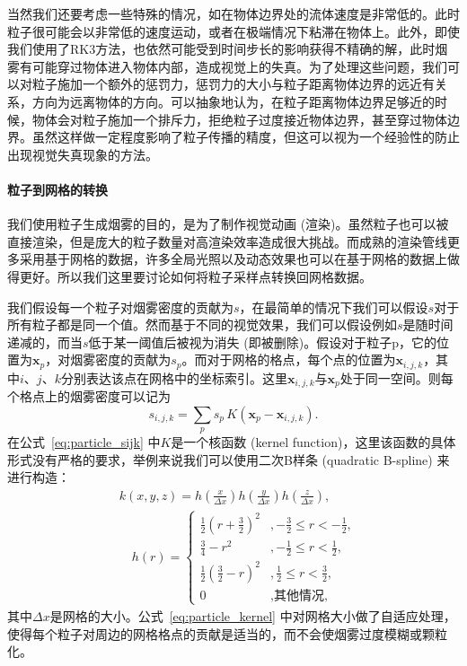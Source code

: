 当然我们还要考虑一些特殊的情况，如在物体边界处的流体速度是非常低的。此时粒子很可能会以非常低的速度运动，或者在极端情况下粘滞在物体上。此外，即使我们使用了RK3方法，也依然可能受到时间步长的影响获得不精确的解，此时烟雾有可能穿过物体进入物体内部，造成视觉上的失真。为了处理这些问题，我们可以对粒子施加一个额外的惩罚力，惩罚力的大小与粒子距离物体边界的远近有关系，方向为远离物体的方向。可以抽象地认为，在粒子距离物体边界足够近的时候，物体会对粒子施加一个排斥力，拒绝粒子过度接近物体边界，甚至穿过物体边界。虽然这样做一定程度影响了粒子传播的精度，但这可以视为一个经验性的防止出现视觉失真现象的方法。

\paragraph{粒子到网格的转换}
我们使用粒子生成烟雾的目的，是为了制作视觉动画 (渲染)。虽然粒子也可以被直接渲染，但是庞大的粒子数量对高渲染效率造成很大挑战。而成熟的渲染管线更多采用基于网格的数据，许多全局光照以及动态效果也可以在基于网格的数据上做得更好。所以我们这里要讨论如何将粒子采样点转换回网格数据。

我们假设每一个粒子对烟雾密度的贡献为$s$，在最简单的情况下我们可以假设$s$对于所有粒子都是同一个值。然而基于不同的视觉效果，我们可以假设例如$s$是随时间递减的，而当$s$低于某一阈值后被视为消失 (即被删除)。假设对于粒子p，它的位置为$\mathbf{x}_p$，对烟雾密度的贡献为$s_p$。而对于网格的格点，每个点的位置为$\mathbf{x}_{i,j,k}$，其中$i$、$j$、$k$分别表达该点在网格中的坐标索引。这里$\mathbf{x}_{i,j,k}$与$\mathbf{x}_p$处于同一空间。则每个格点上的烟雾密度可以记为
\begin{equation}
    s_{i,j,k}=\sum_p s_p \, K(\mathbf{x}_p-\mathbf{x}_{i,j,k}).
    \label{eq:particle_sijk}
\end{equation}
在公式~\ref{eq:particle_sijk} 中$K$是一个核函数 (kernel function)，这里该函数的具体形式没有严格的要求，举例来说我们可以使用二次B样条 (quadratic B-spline) 来进行构造：
\begin{align}
\label{eq:particle_kernel}
& k(x, y, z)= h\left(\frac{x}{\Delta x}\right) h\left(\frac{y}{\Delta x}\right) h\left(\frac{z}{\Delta x}\right), \\
& \quad h(r)=\left\{\begin{array}{cl}
\frac{1}{2}\left(r+\frac{3}{2}\right)^{2} & ,-\frac{3}{2} \leq r<-\frac{1}{2}, \\
\frac{3}{4}-r^{2} & ,-\frac{1}{2} \leq r<\frac{1}{2}, \\
\frac{1}{2}\left(\frac{3}{2}-r\right)^{2} & ,\frac{1}{2} \leq r<\frac{3}{2}, \\
0 & , \text {其他情况,}
\end{array}\right.
\end{align}
其中$\Delta x$是网格的大小。公式~\ref{eq:particle_kernel} 中对网格大小做了自适应处理，使得每个粒子对周边的网格格点的贡献是适当的，而不会使烟雾过度模糊或颗粒化。

